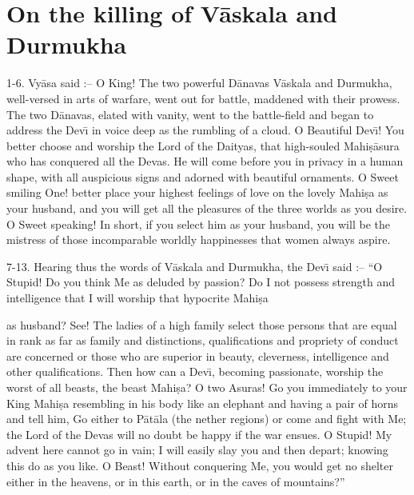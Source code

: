 \chapter{On the killing of V\=askala and Durmukha}

1-6. Vy\=asa said :-- O King! The two powerful D\=anavas V\=askala and Durmukha, well-versed in arts of warfare, went out for battle, maddened with their prowess. The two D\=anavas, elated with vanity, went to the battle-field and began to address the Dev\={\i} in voice deep as the rumbling of a cloud. O Beautiful Dev\={\i}! You better choose and worship the Lord of the Daityas, that high-souled Mahi\d{s}\=asura who has conquered all the Devas. He will come before you in privacy in a human shape, with all auspicious signs and adorned with beautiful ornaments. O Sweet smiling One! better place your highest feelings of love on the lovely Mahi\d{s}a as your husband, and you will get all the pleasures of the three worlds as you desire. O Sweet speaking! In short, if you select him as your husband, you will be the mistress of those incomparable worldly happinesses that women always aspire.

7-13. Hearing thus the words of V\=askala and Durmukha, the Dev\={\i} said :-- ``O Stupid! Do you think Me as deluded by passion? Do I not possess strength and intelligence that I will worship that hypocrite Mahi\d{s}a

as husband? See! The ladies of a high family select those persons that are equal in rank as far as family and distinctions, qualifications and propriety of conduct are concerned or those who are superior in beauty, cleverness, intelligence and other qualifications. Then how can a Dev\={\i}, becoming passionate, worship the worst of all beasts, the beast Mahi\d{s}a? O two Asuras! Go you immediately to your King Mahi\d{s}a resembling in his body like an elephant and having a pair of horns and tell him, Go either to P\=at\=ala (the nether regions) or come and fight with Me; the Lord of the Devas will no doubt be happy if the war ensues. O Stupid! My advent here cannot go in vain; I will easily slay you and then depart; knowing this do as you like. O Beast! Without conquering Me, you would get no shelter either in the heavens, or in this earth, or in the caves of mountains?''

